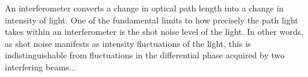 An interferometer converts a change in optical path length into a change in intensity of light. One of the fundamental limits to how precisely the path light takes within an interferometer is the shot noise level of the light. In other words, as shot noise manifests as intensity fluctuations of the light, this is indistinguishable from fluctuations in the differential phase acquired by two interfering beams...

